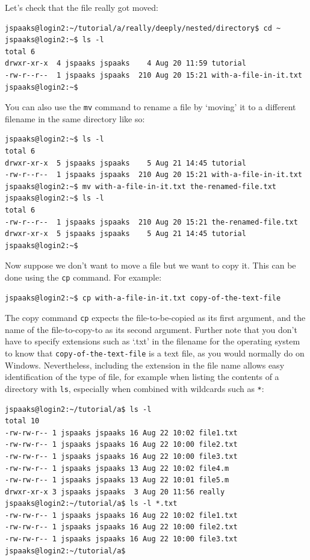 Let's check that the file really got moved:
\begin{lstlisting}[style=basic,style=bash]
jspaaks@login2:~/tutorial/a/really/deeply/nested/directory$ cd ~
jspaaks@login2:~$ ls -l
total 6
drwxr-xr-x  4 jspaaks jspaaks    4 Aug 20 11:59 tutorial
-rw-r--r--  1 jspaaks jspaaks  210 Aug 20 15:21 with-a-file-in-it.txt
jspaaks@login2:~$
\end{lstlisting}

You can also use the \lstinline[style=bashinline]{mv} command to rename a file by `moving' it to a different filename in the same directory like so:
\begin{lstlisting}[style=basic,style=bash]
jspaaks@login2:~$ ls -l
total 6
drwxr-xr-x  5 jspaaks jspaaks    5 Aug 21 14:45 tutorial
-rw-r--r--  1 jspaaks jspaaks  210 Aug 20 15:21 with-a-file-in-it.txt
jspaaks@login2:~$ mv with-a-file-in-it.txt the-renamed-file.txt
jspaaks@login2:~$ ls -l
total 6
-rw-r--r--  1 jspaaks jspaaks  210 Aug 20 15:21 the-renamed-file.txt
drwxr-xr-x  5 jspaaks jspaaks    5 Aug 21 14:45 tutorial
jspaaks@login2:~$
\end{lstlisting}


Now suppose we don't want to move a file but we want to copy it. This can be done using the \lstinline[style=bashinline]{cp} command. For example:
\begin{lstlisting}[style=basic,style=bash]
jspaaks@login2:~$ cp with-a-file-in-it.txt copy-of-the-text-file
\end{lstlisting}
The copy command \lstinline[style=bashinline]{cp} expects the file-to-be-copied as its first argument, and the name of the file-to-copy-to as its second argument. Further note that you don't have to specify extensions such as `.txt' in the filename for the operating system to know that \lstinline[style=bashinline]{copy-of-the-text-file} is a text file, as you would normally do on Windows. Nevertheless, including the extension in the file name allows easy identification of the type of file, for example when listing the contents of a directory with \lstinline[style=bashinline]{ls}, especially when combined with wildcards such as \lstinline[style=bashinline]{*}:

\begin{lstlisting}[style=basic,style=bash]
jspaaks@login2:~/tutorial/a$ ls -l
total 10
-rw-rw-r-- 1 jspaaks jspaaks 16 Aug 22 10:02 file1.txt
-rw-rw-r-- 1 jspaaks jspaaks 16 Aug 22 10:00 file2.txt
-rw-rw-r-- 1 jspaaks jspaaks 16 Aug 22 10:00 file3.txt
-rw-rw-r-- 1 jspaaks jspaaks 13 Aug 22 10:02 file4.m
-rw-rw-r-- 1 jspaaks jspaaks 13 Aug 22 10:01 file5.m
drwxr-xr-x 3 jspaaks jspaaks  3 Aug 20 11:56 really
jspaaks@login2:~/tutorial/a$ ls -l *.txt
-rw-rw-r-- 1 jspaaks jspaaks 16 Aug 22 10:02 file1.txt
-rw-rw-r-- 1 jspaaks jspaaks 16 Aug 22 10:00 file2.txt
-rw-rw-r-- 1 jspaaks jspaaks 16 Aug 22 10:00 file3.txt
jspaaks@login2:~/tutorial/a$
\end{lstlisting}


